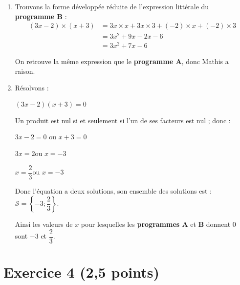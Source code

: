 \documentclass[12pt,a4paper,french]{article}
\begin{document}
\begin{enumerate}
	En appliquant le \textbf{programme B} à $x$, on obtient l'expression :\quad $(3x-2)(x+3)$.

	\item Trouvons la forme développée réduite de l'expression littérale du \textbf{programme B} :
	\begin{align*}
	(3x-2)\times (x+3)&=3x\times x+3x\times 3+(-2)\times x+(-2)\times 3\\
	&=3x^2+9x-2x-6\\
	&=3x^2+7x-6
	\end{align*}

	On retrouve la même expression que le \textbf{programme A}, donc Mathis a raison.

	\item Résolvons :
	\begin{center}
	$(3x-2)(x+3) = 0$

	Un produit est nul si et seulement si l'un de ses facteurs est nul ; donc :

	$3x-2=0$ \quad ou \quad $x+3=0$

	$3x=2$\quad ou \quad $x=-3$

	$x=\dfrac{2}{3}$\quad ou \quad $x=-3$
	\end{center}

	Donc l'équation a deux solutions, son ensemble des solutions est :\quad $\mathcal{S}=\left\{-3 ;\dfrac{2}{3} \right\}$.


	Ainsi les valeurs de $x$ pour lesquelles les \textbf{programmes A} et \textbf{B} donnent 0 sont $-3$ et $\dfrac{2}{3}$.
\end{enumerate}


\newpage
\section*{Exercice 4 (2,5 points)}
\end{document}
